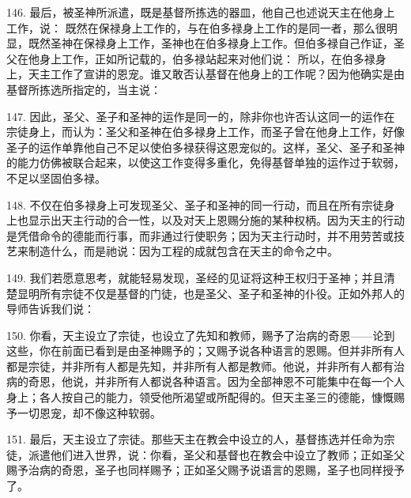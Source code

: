 146. 最后，被圣神所派遣，既是基督所拣选的器皿，他自己也述说天主在他身上工作，说： 既然在保禄身上工作的，与在伯多禄身上工作的是同一者，那么很明显，既然圣神在保禄身上工作，圣神也在伯多禄身上工作。但伯多禄自己作证，圣父在他身上工作，正如所记载的，伯多禄站起来对他们说： 所以，在伯多禄身上，天主工作了宣讲的恩宠。谁又敢否认基督在他身上的工作呢？因为他确实是由基督所拣选所指定的，当主说：\par

147. 因此，圣父、圣子和圣神的运作是同一的，除非你也许否认这同一的运作在宗徒身上，而认为：圣父和圣神在伯多禄身上工作，而圣子曾在他身上工作，好像圣子的运作单靠他自己不足以使伯多禄获得这恩宠似的。这样，圣父、圣子和圣神的能力仿佛被联合起来，以使这工作变得多重化，免得基督单独的运作过于软弱，不足以坚固伯多禄。\par

148. 不仅在伯多禄身上可发现圣父、圣子和圣神的同一行动，而且在所有宗徒身上也显示出天主行动的合一性，以及对天上恩赐分施的某种权柄。因为天主的行动是凭借命令的德能而行事，而非通过行使职务；因为天主行动时，并不用劳苦或技艺来制造什么，而是祂说：因为工程的成就包含在天主的命令之中。\par

149. 我们若愿意思考，就能轻易发现，圣经的见证将这种王权归于圣神；并且清楚显明所有宗徒不仅是基督的门徒，也是圣父、圣子和圣神的仆役。正如外邦人的导师告诉我们说：\par

150. 你看，天主设立了宗徒，也设立了先知和教师，赐予了治病的奇恩——论到这些，你在前面已看到是由圣神赐予的；又赐予说各种语言的恩赐。但并非所有人都是宗徒，并非所有人都是先知，并非所有人都是教师。他说，并非所有人都有治病的奇恩，他说，并非所有人都说各种语言。因为全部神恩不可能集中在每一个人身上；各人按自己的能力，领受他所渴望或所配得的。但天主圣三的德能，慷慨赐予一切恩宠，却不像这种软弱。\par

151. 最后，天主设立了宗徒。那些天主在教会中设立的人，基督拣选并任命为宗徒，派遣他们进入世界，说：你看，圣父和基督也在教会中设立了教师；正如圣父赐予治病的奇恩，圣子也同样赐予；正如圣父赐予说语言的恩赐，圣子也同样授予了。\par

